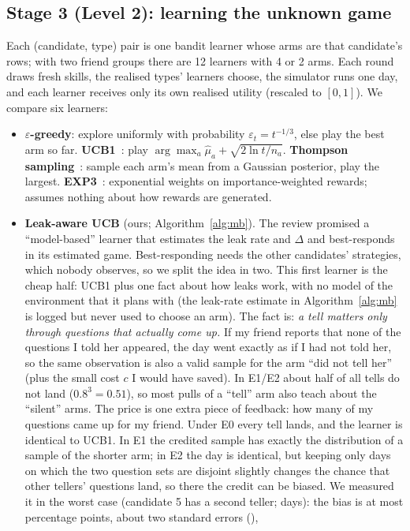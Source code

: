 \documentclass[10pt]{article}
\theoremstyle{plain}
\theoremstyle{definition}\newtheorem{definition}{Definition}
\begin{document}
\subsection{Stage 3 (Level 2): learning the unknown game}
Each (candidate, type) pair is one bandit learner whose arms are that candidate's rows; with two friend groups there are 12 learners with 4 or 2 arms. Each round draws fresh skills, the realised
types' learners choose, the simulator runs one day, and each learner receives only its own realised utility (rescaled to $[0,1]$). We compare six learners:
\begin{itemize}
\item \textbf{$\varepsilon$-greedy}: explore uniformly with probability $\varepsilon_t=t^{-1/3}$, else play the best arm so far.
\textbf{UCB1}~\cite{ucb}: play $\arg\max_a\hat\mu_a+\sqrt{2\ln t/n_a}$.
\textbf{Thompson sampling}~\cite{thompson}: sample each arm's mean from a Gaussian posterior, play the largest.
\textbf{EXP3}~\cite{exp3}: exponential weights on importance-weighted rewards; assumes nothing about how rewards are generated.
\item \textbf{Leak-aware UCB} (ours; Algorithm~\ref{alg:mb}). The review promised a ``model-based'' learner that estimates the leak rate and $\Delta$ and best-responds in its
estimated game. Best-responding needs the other candidates' strategies, which nobody observes, so we split the idea in two. This first learner is the cheap half: UCB1 plus one fact about how
leaks work, with no model of the environment that it plans with (the leak-rate estimate in Algorithm~\ref{alg:mb} is logged but never used to choose an arm). The fact is: \emph{a tell matters only through questions that actually come up.} If my friend reports that none of the questions I told her appeared, the day
went exactly as if I had not told her, so the same observation is also a valid sample for the arm ``did not tell her'' (plus the small cost $c$ I would have saved).
In E1/E2 about half of all tells do not land ($0.8^3=0.51$), so most pulls of a ``tell'' arm also teach about the ``silent'' arms. The price is one extra piece of feedback: how many of my questions
came up for my friend. Under E0 every tell lands, and the learner is identical to UCB1. In E1 the credited sample has exactly the distribution of a sample of the shorter arm; in E2 the day is identical,
but keeping only days on which the two question sets are disjoint slightly changes the chance that other tellers' questions land, so there the credit can be biased. We measured it in the worst case (candidate 5 has a second teller; \EtwoBiasDays{} days): the bias is at most \EtwoBiasMax{} percentage points, about two standard errors (\EtwoBiasSe{}),

\end{itemize}
\end{document}

